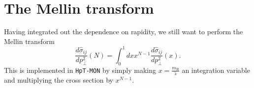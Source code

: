 \documentclass[10pt]{report}
\begin{document}
\section{The Mellin transform}
Having integrated out the dependence on rapidity, we still want to perform the Mellin transform 
\begin{equation}
\frac{d \hat{\sigma}_{i j}}{d p_\perp^2}\left(N\right)=\int_{0}^{1} d x x^{N-1} \frac{d \hat{\sigma}_{i j}}{d p_\perp^2}\left(x\right).
\end{equation}
This is implemented in \texttt{HpT-MON} by simply making $x=\frac{m_\mathrm{H}}{\hat{s}}$ an integration variable and multiplying the cross section by $x^{N-1}$.










\printbibliography
\end{document}
